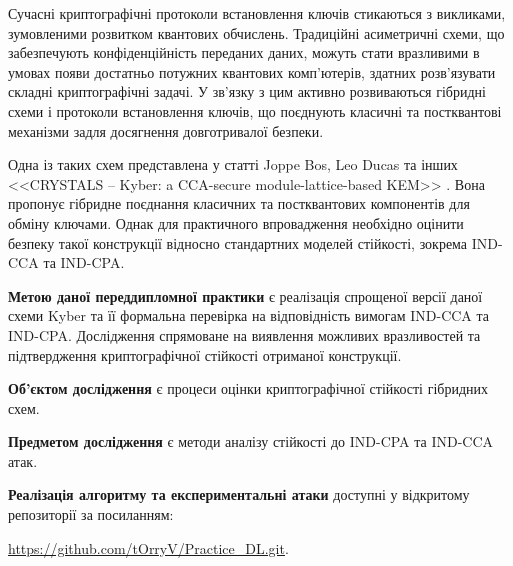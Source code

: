Сучасні криптографічні протоколи встановлення ключів стикаються з викликами, зумовленими розвитком квантових обчислень. Традиційні асиметричні схеми, що забезпечують конфіденційність переданих даних, можуть стати вразливими в умовах появи достатньо потужних квантових комп'ютерів, здатних розв'язувати складні криптографічні задачі. У зв'язку з цим активно розвиваються гібридні схеми і протоколи встановлення ключів, що поєднують класичні та постквантові механізми задля досягнення довготривалої безпеки.

Одна із таких схем представлена у статті Joppe Bos, Leo Ducas та інших <<CRYSTALS – Kyber: a CCA-secure module-lattice-based KEM>> \cite{KyberCCA}. Вона пропонує гібридне поєднання класичних та постквантових компонентів для обміну ключами. Однак для практичного впровадження необхідно оцінити безпеку такої конструкції відносно стандартних моделей стійкості, зокрема IND-CCA та IND-CPA.

\textbf{Метою даної переддипломної практики} є реалізація спрощеної версії даної схеми Kyber та її формальна перевірка на відповідність вимогам IND-CCA та IND-CPA. Дослідження спрямоване на виявлення можливих вразливостей та підтвердження криптографічної стійкості отриманої конструкції.

\textbf{Об’єктом дослідження} є процеси оцінки криптографічної стійкості гібридних схем.

\textbf{Предметом дослідження} є методи аналізу стійкості до IND-CPA та IND-CCA атак.

\textbf{Реалізація алгоритму та експериментальні атаки} доступні у відкритому репозиторії за посиланням: 

\url{https://github.com/tOrryV/Practice_DL.git}.

